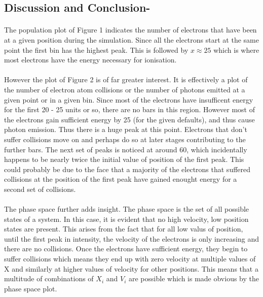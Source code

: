 \documentclass[a4paper, 11pt, margin= 1.25cm]{article}
\begin{document}
        \begin{center}
    \end{center}
\begin{multicols}{2}
    \section{Discussion and Conclusion-}\label{discussion-and-conclusion-}

\paragraph{}The population plot of Figure 1 indicates the number of electrons that
have been at a given position during the simulation. Since all the
electrons start at the same point the first bin has the highest peak.
This is followed by $x\approx25$ which is where most electrons have the
energy necessary for ionisation.

\paragraph{} However the plot of Figure 2 is of far greater interest. It is
effectively a plot of the number of electron atom collisions or the
number of photons emitted at a given point or in a given bin. Since most
of the electrons have insufficent energy for the first 20 - 25 units or
so, there are no bars in this region. However most of the electrons gain
sufficient energy by 25 (for the given defaults), and thus cause photon
emission. Thus there is a huge peak at this point. Electrons that don't
suffer collisions move on and perhaps do so at later stages contributing
to the further bars. The next set of peaks is noticed at around 60,
which incidentally happens to be nearly twice the initial value of
position of the first peak. This could probably be due to the face that
a majority of the electrons that suffered collisions at the position of
the first peak have gained enought energy for a second set of
collisions.

\paragraph{} The phase space further adds insight. The phase space is the set of all
possible states of a system. In this case, it is evident that no high
velocity, low position states are present. This arises from the fact
that for all low valus of position, until the first peak in intensity,
the velocity of the electrons is only increasing and there are no
collisions. Once the electrons have sufficient energy, they begin to
suffer collisions which means they end up with zero velocity at multiple
values of X and similarly at higher values of velocity for other
positions. This means that a multitude of combinations of $X_i$ and
$V_i$ are possible which is made obvious by the phase space plot.


\end{multicols}
\end{document}
